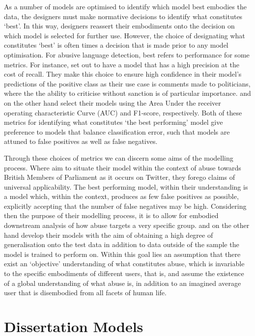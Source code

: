 As a number of models are optimised to identify which model best embodies the data, the designers must make normative decisions to identify what constitutes `best'. In this way, designers reassert their embodiments onto the decision on which model is selected for further use. However, the choice of designating what constitutes `best' is often times a decision that is made prior to any model optimisation. For abusive language detection, best refers to performance for some metrics. For instance, \citet{Gorrell:2018} set out to have a model that has a high precision at the cost of recall. They make this choice to ensure high confidence in their model's predictions of the positive class as their use case is comments made to politicians, where the the ability to criticise without sanction is of particular importance. \citet{Wulczyn:2016} and \citet{Kshirsagar:2018} on the other hand select their models using the Area Under the receiver operating characteristic Curve (AUC) and F1-score, respectively. Both of these metrics for identifying what constitutes `the best performing' model give preference to models that balance classification error, such that models are attuned to false positives as well as false negatives.

Through these choices of metrics we can discern some aims of the modelling process. Where \citet{Gorrell:2018} aim to situate their model within the context of abuse towards British Members of Parliament as it occurs on Twitter, they forego claims of universal applicability. The best performing model, within their understanding is a model which, within the context, produces as few false positives as possible, explicitly accepting that the number of false negatives may be high. Considering then the purpose of their modelling process, it is to allow for embodied downstream analysis of how abuse targets a very specific group. \citet{Wulczyn:2016} and \citet{Kshirsagar:2018} on the other hand develop their models with the aim of obtaining a high degree of generalisation onto the test data in addition to data outside of the sample the model is trained to perform on. Within this goal lies an assumption that there exist an `objective' understanding of what constitutes abuse, which is invariable to the specific embodiments of different users, that is, \citet{Wulczyn:2016} and \citet{Kshirsagar:2018} assume the existence of a global understanding of what abuse is, in addition to an imagined average user that is disembodied from all facets of human life.

\section{Dissertation Models}

